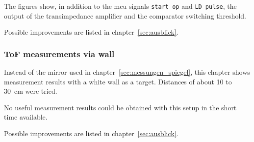 The figures show, in addition to the \acrshort{mcu} signals \lstinline|start_op| and \lstinline|LD_pulse|, the output
of the transimpedance amplifier and the comparator switching threshold.

Possible improvements are listed in chapter~\ref{sec:ausblick}.

\subsubsection{ToF measurements via wall}\label{sec:messungen_wand}

Instead of the mirror used in chapter~\ref{sec:messungen_spiegel}, this chapter shows measurement results with a white
wall as a target. Distances of about 10 to 30~cm were tried.

No useful measurement results could be obtained with this setup in the short time available.

Possible improvements are listed in chapter~\ref{sec:ausblick}.

